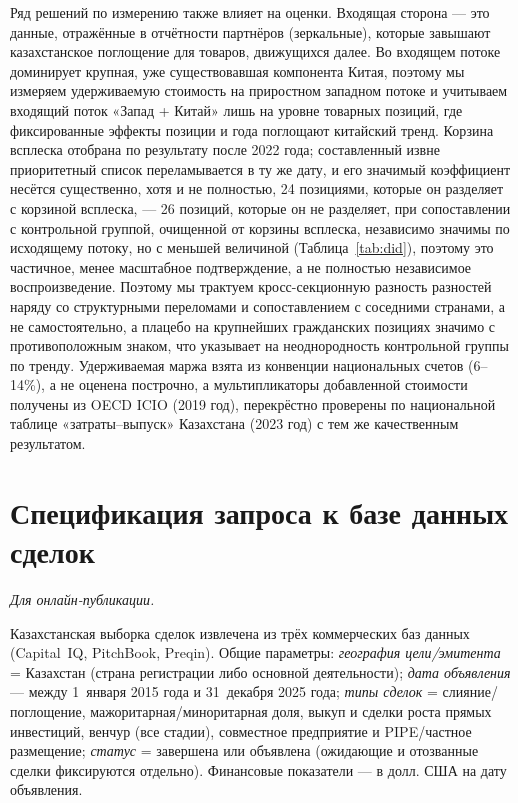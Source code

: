 \documentclass[12pt]{article}
\begin{document}
Ряд решений по измерению также влияет на оценки. Входящая сторона — это данные,
отражённые в отчётности партнёров (зеркальные), которые завышают казахстанское поглощение
для товаров, движущихся далее. Во входящем потоке доминирует крупная, уже существовавшая
компонента Китая, поэтому мы измеряем удерживаемую стоимость на приростном западном потоке
и учитываем входящий поток «Запад + Китай» лишь на уровне товарных позиций, где
фиксированные эффекты позиции и года поглощают китайский тренд. Корзина всплеска отобрана
по результату после 2022 года; составленный извне приоритетный список переламывается в ту
же дату, и его значимый коэффициент несётся существенно, хотя и не полностью, 24 позициями,
которые он разделяет с корзиной всплеска, — 26 позиций, которые он не разделяет, при
сопоставлении с контрольной группой, очищенной от корзины всплеска, независимо значимы по
исходящему потоку, но с меньшей величиной (Таблица~\ref{tab:did}), поэтому это частичное,
менее масштабное подтверждение, а не полностью независимое воспроизведение. Поэтому мы
трактуем кросс-секционную разность разностей наряду со структурными переломами и
сопоставлением с соседними странами, а не самостоятельно, а плацебо на крупнейших
гражданских позициях значимо с противоположным знаком, что указывает на неоднородность
контрольной группы по тренду. Удерживаемая маржа взята из конвенции национальных счетов
(6--14\%), а не оценена построчно, а мультипликаторы добавленной стоимости получены из
OECD ICIO (2019 год), перекрёстно проверены по национальной таблице «затраты--выпуск»
Казахстана (2023 год) с тем же качественным результатом.

\appendix
\renewcommand{\thesection}{\Alph{section}}

\section{Спецификация запроса к базе данных сделок}\label{app:deals}
\emph{Для онлайн-публикации.}

\medskip
Казахстанская выборка сделок извлечена из трёх коммерческих баз данных (Capital~IQ,
PitchBook, Preqin). Общие параметры: \emph{география цели/эмитента} = Казахстан (страна
регистрации либо основной деятельности); \emph{дата объявления} — между 1~января 2015 года
и 31~декабря 2025 года; \emph{типы сделок} = слияние/поглощение, мажоритарная/миноритарная
доля, выкуп и сделки роста прямых инвестиций, венчур (все стадии), совместное предприятие и
PIPE/частное размещение; \emph{статус} = завершена или объявлена (ожидающие и отозванные
сделки фиксируются отдельно). Финансовые показатели — в долл. США на дату объявления.
\end{document}
